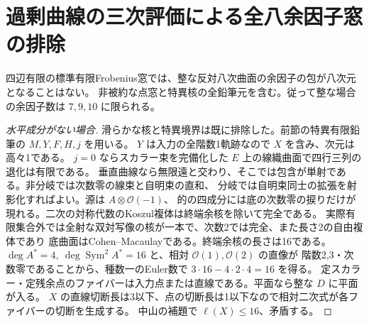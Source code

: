\section{過剰曲線の三次評価による全八余因子窓の排除}
\label{sec:eight-cofactor-excess}
\begin{theorem}\label{thm:eight-cofactor-excess}
四辺有限の標準有限Frobenius窓では、整な反対八次曲面の余因子の包が八次元となることはない。
非被約な点窓と特異核の全鉛筆元を含む。従って整な場合の余因子数は $7,9,10$ に限られる。
\end{theorem}
\begin{proof}[水平成分がない場合]
滑らかな核と特異境界は既に排除した。前節の特異有限鉛筆の $M,Y,F,H,j$ を用いる。
$Y$ は入力の全階数1軌跡なので $X$ を含み、次元は高々1である。
$j=0$ ならスカラー束を完備化した $E$ 上の線織曲面で四行三列の退化は有限である。
垂直曲線なら無限遠と交わり、そこでは包含が単射である。非分岐では次数零の線束と自明束の直和、
分岐では自明束同士の拡張を射影化すればよい。源は $A\otimes\mathcal O(-1)$、
的の四成分には底の次数零の捩りだけが現れる。二次の対称代数のKoszul複体は終端余核を除いて完全である。
実際有限集合外では全射な双対写像の核が一本で、次数2では完全、また長さ2の自由複体であり
底曲面はCohen--Macaulayである。終端余核の長さは16である。
$\deg A^*=4,\ \deg\operatorname{Sym}^2A^*=16$ と、相対 $\mathcal O(1),\mathcal O(2)$ の直像が
階数2,3・次数零であることから、種数一のEuler数で $3\cdot16-4\cdot2\cdot4=16$ を得る。
定スカラー・定残余点のファイバーは入力点または直線である。平面なら整な $D$ に平面が入る。
$X$ の直線切断長は3以下、点の切断長は1以下なので相対二次式が各ファイバーの切断を生成する。
中山の補題で $\ell(X)\le16$、矛盾する。
\end{proof}

